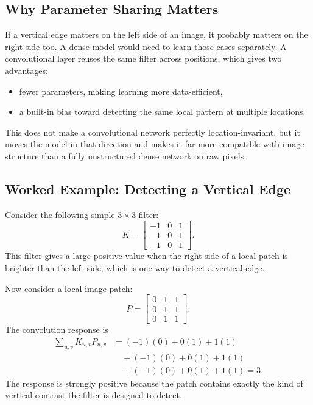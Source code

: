 \subsection{Why Parameter Sharing Matters}

If a vertical edge matters on the left side of an image, it probably matters on the right side too. A dense model would need to learn those cases separately. A convolutional layer reuses the same filter across positions, which gives two advantages:
\begin{itemize}[leftmargin=*]
\item fewer parameters, making learning more data-efficient,
\item a built-in bias toward detecting the same local pattern at multiple locations.
\end{itemize}

This does not make a convolutional network perfectly location-invariant, but it moves the model in that direction and makes it far more compatible with image structure than a fully unstructured dense network on raw pixels.

\subsection{Worked Example: Detecting a Vertical Edge}

Consider the following simple $3 \times 3$ filter:
\[
K =
\begin{bmatrix}
-1 & 0 & 1 \\
-1 & 0 & 1 \\
-1 & 0 & 1
\end{bmatrix}.
\]
This filter gives a large positive value when the right side of a local patch is brighter than the left side, which is one way to detect a vertical edge.

Now consider a local image patch:
\[
P =
\begin{bmatrix}
0 & 1 & 1 \\
0 & 1 & 1 \\
0 & 1 & 1
\end{bmatrix}.
\]
The convolution response is
\begin{align*}
\sum_{u,v} K_{u,v} P_{u,v}
  &= (-1)(0) + 0(1) + 1(1) \\[-2pt]
  &\quad + (-1)(0) + 0(1) + 1(1) \\[-2pt]
  &\quad + (-1)(0) + 0(1) + 1(1) = 3.
\end{align*}
The response is strongly positive because the patch contains exactly the kind of vertical contrast the filter is designed to detect.

